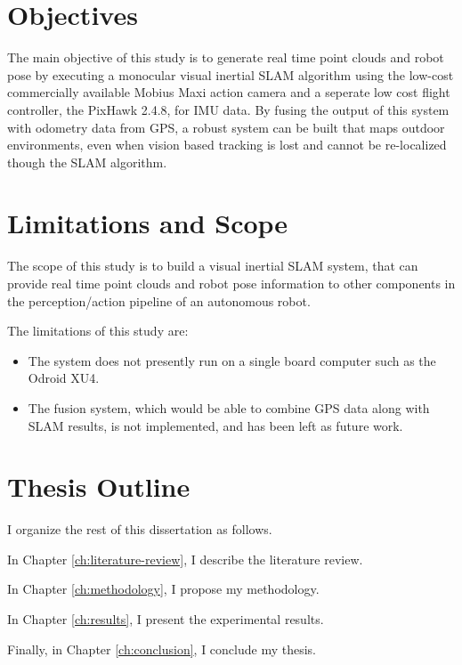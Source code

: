 \section{Objectives}

The main objective of this study is to generate real time point clouds and robot pose by executing a monocular visual inertial SLAM algorithm using the low-cost commercially available Mobius Maxi action camera and a seperate low cost flight controller, the PixHawk 2.4.8, for IMU data. By fusing the output of this system with odometry data from GPS, a robust system can be built that maps outdoor environments, even when vision based tracking is lost and cannot be re-localized though the SLAM algorithm.

\section{Limitations and Scope}

The scope of this study is to build a visual inertial SLAM system, that can provide real time point clouds and robot pose information to other components in the perception/action pipeline of an autonomous robot.

The limitations of this study are:

\begin{itemize}
	\item The system does not presently run on a single board computer such as the Odroid XU4. 
	\item The fusion system, which would be able to combine GPS data along with SLAM results, is not implemented, and has been left as future work.
\end{itemize}

\section{Thesis Outline}

I organize the rest of this dissertation as follows.

In Chapter \ref{ch:literature-review}, I describe the literature review.

In Chapter \ref{ch:methodology}, I propose my methodology.

In Chapter \ref{ch:results}, I present the experimental results.

Finally, in Chapter \ref{ch:conclusion}, I conclude my thesis.

\FloatBarrier
